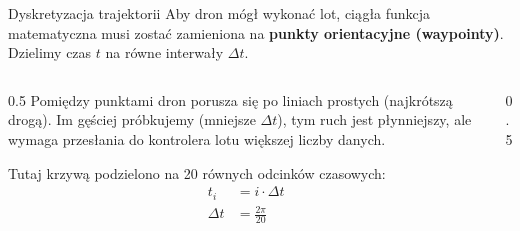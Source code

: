 \begin{frame}{Dyskretyzacja trajektorii}
    Aby dron mógł wykonać lot, ciągła funkcja matematyczna musi zostać zamieniona na \textbf{punkty orientacyjne (waypointy)}.
    Dzielimy czas $t$ na równe interwały $\Delta t$.
    
    \vspace{0.3cm}
    \begin{columns}
        \begin{column}{0.5\textwidth}
            \small
            Pomiędzy punktami dron porusza się po liniach prostych (najkrótszą drogą). 
            Im gęściej próbkujemy (mniejsze $\Delta t$), tym ruch jest płynniejszy, ale wymaga przesłania do kontrolera lotu większej liczby danych.
            
            \vspace{0.3cm}
            Tutaj krzywą podzielono na 20 równych odcinków czasowych:
            \begin{align*}
                t_i &= i \cdot \Delta t \\
                \Delta t &= \frac{2\pi}{20}
            \end{align*}
        \end{column}
        \begin{column}{0.5\textwidth}
            \begin{center}
            \end{center}
        \end{column}
    \end{columns}
\end{frame}
